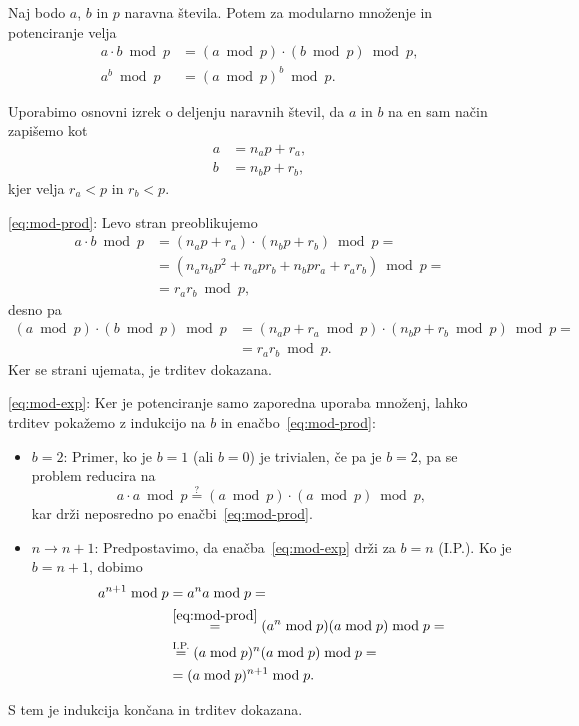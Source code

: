 \begin{trditev}
\label{trd:mod-mn-pt}
    Naj bodo $a$, $b$ in $p$ naravna števila. Potem za modularno množenje in potenciranje velja
    \begin{align}
        a \cdot b \bmod p &= (a \bmod p) \cdot (b \bmod p) \bmod p, \label{eq:mod-prod} \\
        a^b \bmod p &= (a \bmod p)^b \bmod p. \label{eq:mod-exp} 
    \end{align}
\end{trditev}
\begin{dokaz}
    Uporabimo osnovni izrek o deljenju naravnih števil, da $a$ in $b$ na en sam način zapišemo kot 
    \begin{align*}
        a &= n_a p + r_a, \\
        b &= n_b p + r_b,
    \end{align*}
    kjer velja $r_a < p$ in $r_b < p$.

    \eqref{eq:mod-prod}: Levo stran preoblikujemo
    \begin{align*}
        a \cdot b \bmod p &= (n_a p + r_a) \cdot (n_b p + r_b) \bmod p = \\
                          &= (n_a n_b p^2 + n_a p r_b + n_b p r_a + r_a r_b) \bmod p = \\
                          &= r_a r_b \bmod p,
    \end{align*}
    desno pa
    \begin{align*}
        (a \bmod p) \cdot (b \bmod p) \bmod p &= (n_a p + r_a \bmod p) \cdot (n_b p + r_b \bmod p) \bmod p = \\
                          &= r_a r_b \bmod p.
    \end{align*}
    Ker se strani ujemata, je trditev dokazana.

    \eqref{eq:mod-exp}: Ker je potenciranje samo zaporedna uporaba množenj, lahko trditev pokažemo z 
    indukcijo na $b$ in enačbo~\eqref{eq:mod-prod}:
    \begin{itemize}
        \item $b = 2$: Primer, ko je $b = 1$ (ali $b = 0$) je trivialen, če pa je $b = 2$, pa se 
            problem reducira na
            $$ 
            a \cdot a \bmod p \stackrel{?}{=} (a \bmod p) \cdot (a \bmod p) \bmod p,
            $$
            kar drži neposredno po enačbi~\eqref{eq:mod-prod}.
        \item $n \rightarrow n + 1$: Predpostavimo, da enačba~\eqref{eq:mod-exp} drži za $b = n$ (I.P.). 
            Ko je $b = n + 1$, dobimo 
            \begin{align*}
                a^{n + 1} \bmod p &= a^n a \bmod p = \\ 
                                  &\stackrel{\eqref{eq:mod-prod}}{=} (a^n \bmod p) (a \bmod p) \bmod p = \\
                                  &\stackrel{\text{I.P.}}{=} (a \bmod p)^n (a \bmod p) \bmod p = \\
                                  &= (a \bmod p)^{n + 1} \bmod p.
            \end{align*}
    \end{itemize}
    S tem je indukcija končana in trditev dokazana.
\end{dokaz}

